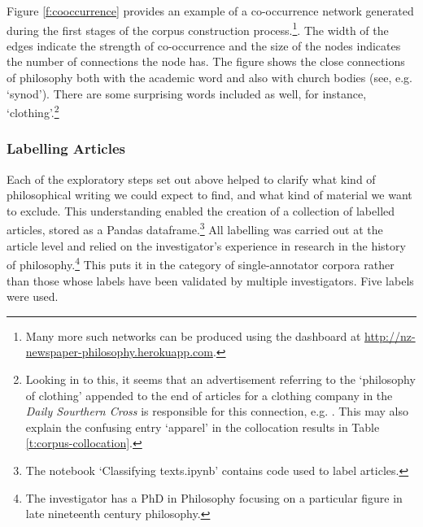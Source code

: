 \documentclass{article}
\begin{document}
Figure \ref{f:cooccurrence} provides an example of a co-occurrence network generated during the first stages of the corpus construction process.\footnote{Many more such networks can be produced using the dashboard at \url{http://nz-newspaper-philosophy.herokuapp.com}.}. The width of the edges indicate the strength of co-occurrence and the size of the nodes indicates the number of connections the node has. The figure shows the close connections of philosophy both with the academic word and also with church bodies (see, e.g. `synod'). There are some surprising words included as well, for instance, `clothing'.\footnote{Looking in to this, it seems that an advertisement referring to the `philosophy of clothing' appended to the end of articles for a clothing company in the \textit{Daily Sourthern Cross} is responsible for this connection, e.g. \cite{clothing-example}. This may also explain the confusing entry `apparel' in the collocation results in Table \ref{t:corpus-collocation}.}

\subsubsection{Labelling Articles}\label{s:labelling}

Each of the exploratory steps set out above helped to clarify what kind of philosophical writing we could expect to find, and what kind of material we want to exclude. This understanding enabled the creation of a collection of labelled articles, stored as a Pandas dataframe.\footnote{The notebook `Classifying texts.ipynb' contains code used to label articles.}  All labelling was carried out at the article level and relied on the investigator's experience in research in the history of philosophy.\footnote{The investigator has a PhD in Philosophy focusing on a particular figure in late nineteenth century philosophy.} This puts it in the category of single-annotator corpora rather than those whose labels have been validated by multiple investigators. Five labels were used.
\end{document}
